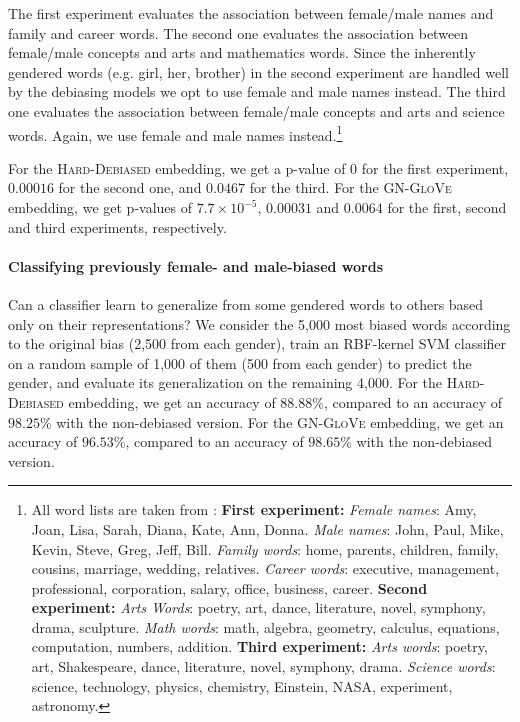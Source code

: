 \documentclass[11pt,a4paper]{article}
\begin{document}
	The first experiment evaluates the association between female/male names and family and career words. The second one evaluates the association between female/male concepts and arts and mathematics words. Since the inherently gendered words (e.g. girl, her, brother) in the second experiment are handled well by the debiasing models we opt to use female and male names instead. The third one evaluates the association between female/male concepts and arts and science words. Again, we use female and male names instead.\footnote{All word lists are taken from \citet{CBN17}: \noindent\textbf{First experiment:} \textit{Female names}: Amy, Joan, Lisa, Sarah, Diana, Kate, Ann, Donna. \textit{Male names}: John, Paul, Mike, Kevin, Steve, Greg, Jeff, Bill. \textit{Family words}: home, parents, children, family, cousins, marriage, wedding, relatives. \textit{Career words}: executive, management, professional, corporation, salary, office, business, career. \noindent\textbf{Second experiment:} \textit{Arts Words}: poetry, art, dance, literature, novel, symphony, drama, sculpture. \textit{Math words}: math, algebra, geometry, calculus, equations, computation, numbers, addition. \noindent\textbf{Third experiment:}  \textit{Arts words}: poetry, art, Shakespeare, dance, literature, novel, symphony, drama. \textit{Science words}: science, technology, physics, chemistry, Einstein, NASA, experiment, astronomy.}
	
	For the \textsc{Hard-Debiased} embedding, we get a p-value of $0$ for the first experiment, $0.00016$ for the second one, and $0.0467$ for the third. For the \textsc{GN-GloVe} embedding, we get p-values of $7.7\times10^{-5}$, $0.00031$ and $0.0064$ for the first, second and third experiments, respectively.
	
	
	\paragraph{Classifying previously female- and male-biased words}
	Can a classifier learn to generalize from some gendered words to others based only on their representations? 
	We consider the 5,000 most biased words according to the original bias (2,500 from each gender), train an RBF-kernel SVM classifier on a random sample of 1,000 of them (500 from each gender) to predict the gender, and evaluate its generalization on the remaining 4,000. For the \textsc{Hard-Debiased} embedding, we get an accuracy of $88.88\%$, compared to an accuracy of $98.25\%$ with the non-debiased version. For the \textsc{GN-GloVe} embedding, we get an accuracy of $96.53\%$, compared to an accuracy of $98.65\%$ with the non-debiased version.
	
\end{document}
